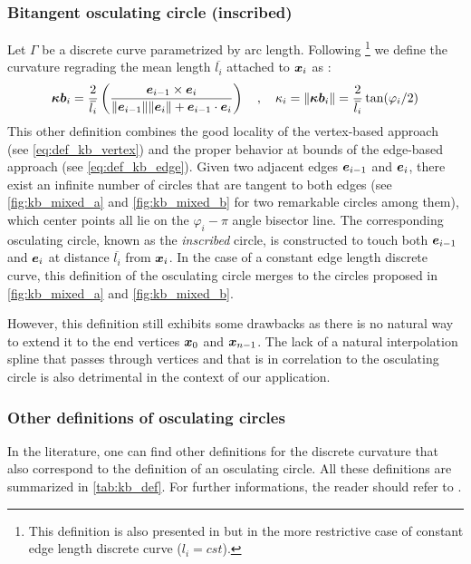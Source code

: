 \subsubsection{Bitangent osculating circle (inscribed)} \label{sec:inscribed}
Let $\Gamma$ be a discrete curve parametrized by arc length. Following \cite{Vouga2014}\footnote{This definition is also presented in \cite{Bobenko2015, Carroll2014} but in the more restrictive case of constant edge length discrete curve ($l_i = cst$).} we define the curvature regrading the mean length $\overbar{l_i}$ attached to $\boldsymbol{x}_{i}$ as :
\begin{equation}
	\vect{\kappa b}_i = \frac{2}{\overbar{l_i}} \left( \frac{\vect{e}_{i-1} \times \vect{e}_{i}}{\norm{\vect{e}_{i-1}} \norm{\vect{e}_{i}} + \vect{e}_{i-1} \cdot \vect{e}_{i}} \right)
	\quad , \quad
	\kappa_i = \norm{\vect{\kappa b}_i} = \frac{2}{\overbar{l_i}} \tan(\varphi_i/2)
\end{equation}
This other definition combines the good locality of the vertex-based approach (see \cref{eq:def_kb_vertex}) and the proper behavior at bounds of the edge-based approach (see \cref{eq:def_kb_edge}). Given two adjacent edges $\boldsymbol{e}_{i-1}$ and $\boldsymbol{e}_{i}$, there exist an infinite number of circles that are tangent to both edges (see \cref{fig:kb_mixed_a} and \cref{fig:kb_mixed_b} for two remarkable circles among them), which center points all lie on the $\varphi_i-\pi$ angle bisector line. The corresponding osculating circle, known as the \emph{inscribed} circle, is constructed to touch both $\boldsymbol{e}_{i-1}$ and $\boldsymbol{e}_{i}$ at distance $\overbar{l_i}$ from $\boldsymbol{x}_{i}$. In the case of a constant edge length discrete curve, this definition of the osculating circle merges to the circles proposed in \cref{fig:kb_mixed_a} and \cref{fig:kb_mixed_b}.

However, this definition still exhibits some drawbacks as there is no natural way to extend it to the end vertices $\boldsymbol{x}_{0}$ and $\boldsymbol{x}_{n-1}$. The lack of a natural interpolation spline that passes through vertices and that is in correlation to the osculating circle is also detrimental in the context of our application.

\subsubsection{Other definitions of osculating circles}
In the literature, one can find other definitions for the discrete curvature that also correspond to the definition of an osculating circle. All these definitions are summarized in \cref{tab:kb_def}. For further informations, the reader should refer to \cite{Carroll2014, Vouga2014, Bobenko2015, Romon2013}.

